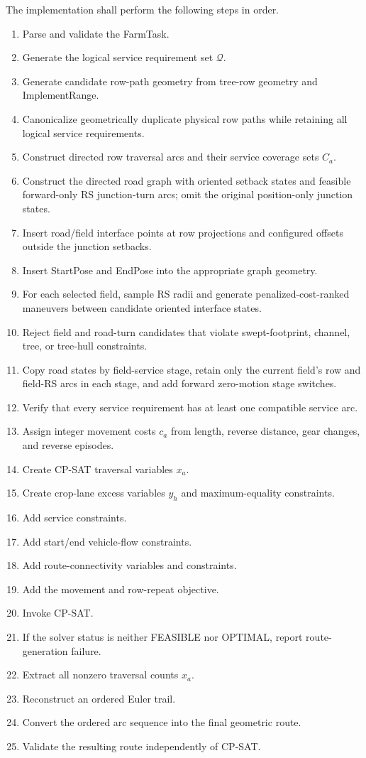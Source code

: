 \documentclass{article}
\begin{document}
The implementation shall perform the following steps in order.
\begin{enumerate}
\item Parse and validate the FarmTask.
\item Generate the logical service requirement set $\mathcal{Q}$.
\item Generate candidate row-path geometry from tree-row geometry and ImplementRange.
\item Canonicalize geometrically duplicate physical row paths while retaining all logical service requirements.
\item Construct directed row traversal arcs and their service coverage sets $C_a$.
\item Construct the directed road graph with oriented setback states and feasible forward-only RS junction-turn arcs; omit the original position-only junction states.
\item Insert road/field interface points at row projections and configured offsets outside the junction setbacks.
\item Insert StartPose and EndPose into the appropriate graph geometry.
\item For each selected field, sample RS radii and generate penalized-cost-ranked maneuvers between candidate oriented interface states.
\item Reject field and road-turn candidates that violate swept-footprint, channel, tree, or tree-hull constraints.
\item Copy road states by field-service stage, retain only the current field's row and field-RS arcs in each stage, and add forward zero-motion stage switches.
\item Verify that every service requirement has at least one compatible service arc.
\item Assign integer movement costs $c_a$ from length, reverse distance, gear changes, and reverse episodes.
\item Create CP-SAT traversal variables $x_a$.
\item Create crop-lane excess variables $y_h$ and maximum-equality constraints.
\item Add service constraints.
\item Add start/end vehicle-flow constraints.
\item Add route-connectivity variables and constraints.
\item Add the movement and row-repeat objective.
\item Invoke CP-SAT.
\item If the solver status is neither FEASIBLE nor OPTIMAL, report route-generation failure.
\item Extract all nonzero traversal counts $x_a$.
\item Reconstruct an ordered Euler trail.
\item Convert the ordered arc sequence into the final geometric route.
\item Validate the resulting route independently of CP-SAT.

\end{enumerate}
\end{document}
